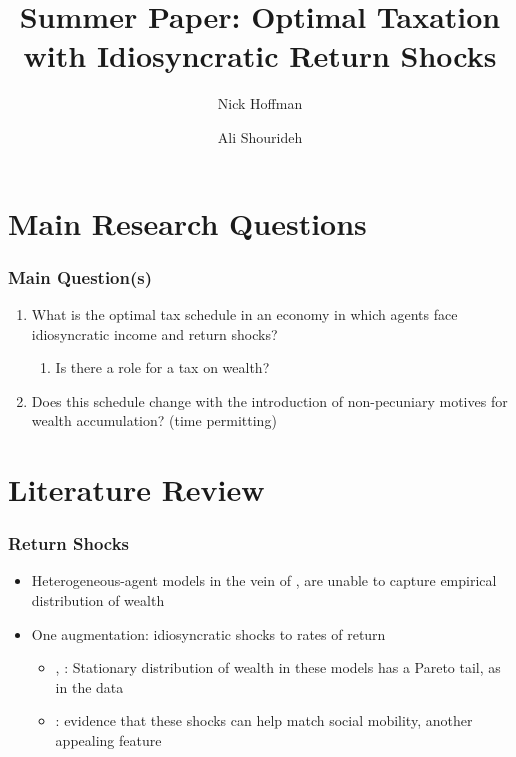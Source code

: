 \documentclass{beamer}
\title{Summer Paper: Optimal Taxation with Idiosyncratic Return Shocks}
\author[Hoffman, Shourideh]
{Nick Hoffman\inst{1} \and Ali Shourideh \inst{1}}
\institute[ ] 
{\inst{1} Carnegie Mellon University}
\begin{document}
    \begin{frame}
        \titlepage 
    \end{frame}

\begin{frame}
    \frametitle{}
    \tableofcontents
\end{frame}

\section{Main Research Questions}
\begin{frame}
    \frametitle{Main Question(s)}

    \begin{enumerate}
        \item What is the optimal tax schedule in an economy in which agents face idiosyncratic income and return shocks?
        \begin{enumerate}
            \item Is there a role for a tax on wealth?
        \end{enumerate}
        \item Does this schedule change with the introduction of non-pecuniary motives for wealth accumulation? (time permitting)
    \end{enumerate}

\end{frame}
\section{Literature Review}

\begin{frame}
    \frametitle{Return Shocks}

    \begin{itemize}
        \item Heterogeneous-agent models in the vein of \cite{aiyagari1994uninsured}, \cite{huggett1996wealth} are unable to capture empirical distribution of wealth 
        \item One augmentation: idiosyncratic shocks to rates of return 
        \begin{itemize}
            \item \cite{benhabib2011distribution}, \cite{benhabib2015wealth}: Stationary distribution of wealth in these models has a Pareto tail, as in the data 
            \item \cite{benhabib2019wealth}: evidence that these shocks can help match social mobility, another appealing feature 
        \end{itemize}
    \end{itemize}

\end{frame}
\end{document}
